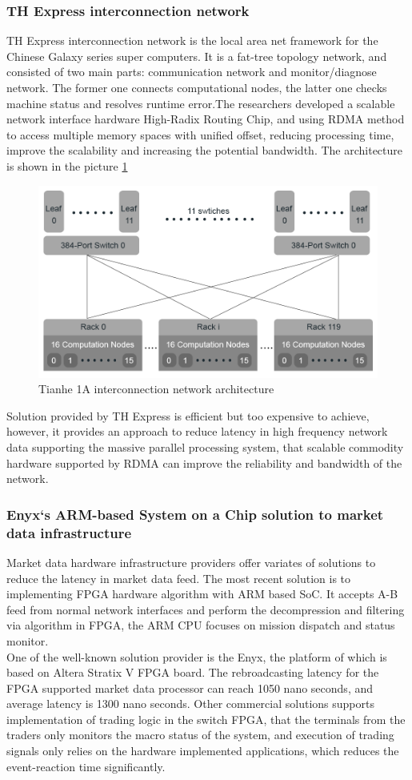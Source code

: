 \documentclass[11pt,openright,a4paper]{report}
\begin{document}
\subsubsection{TH Express interconnection network}
TH Express interconnection network is the local area net framework for the Chinese Galaxy series super computers. It is a fat-tree topology network, and consisted of two main parts: communication network and monitor/diagnose network\cite{yang2011tianhe}. The former one connects computational nodes, the latter one checks machine status and resolves runtime error.The researchers developed a scalable network interface hardware High-Radix Routing Chip, and using RDMA method to access multiple memory spaces with unified offset, reducing processing time, improve the scalability and increasing the potential bandwidth. The architecture is shown in the picture \ref{fig:tianhe1a}\\
\begin{figure}[H]
	\centering
	\includegraphics[width=0.7\linewidth]{picture/tianhe1A.PNG}
	\caption{Tianhe 1A interconnection network architecture}
	\label{fig:tianhe1a}
\end{figure}
Solution provided by TH Express is efficient but too expensive to achieve, however, it provides an approach to reduce latency in high frequency network data supporting the massive parallel processing system, that scalable commodity hardware supported by RDMA can improve the reliability and bandwidth of the network.\\
\subsubsection{Enyx`s ARM-based System on a Chip solution to market data infrastructure}
Market data hardware infrastructure providers offer variates of solutions to reduce the latency in market data feed. The most recent solution is to implementing FPGA hardware algorithm with ARM based SoC. It accepts A-B feed from normal network interfaces and perform the decompression and filtering via algorithm in FPGA, the ARM CPU focuses on mission dispatch and status monitor.\\
One of the well-known solution provider is the Enyx, the platform of which is based on Altera Stratix V FPGA board. The rebroadcasting latency for the FPGA supported market data processor can reach 1050 nano seconds, and average latency is 1300 nano seconds\cite{ciscoWhitePaper}. Other commercial solutions supports implementation of trading logic in the switch FPGA, that the terminals from the traders only monitors the macro status of the system, and execution of trading signals only relies on the hardware implemented applications, which reduces the event-reaction time significantly.\\ 
\end{document}
